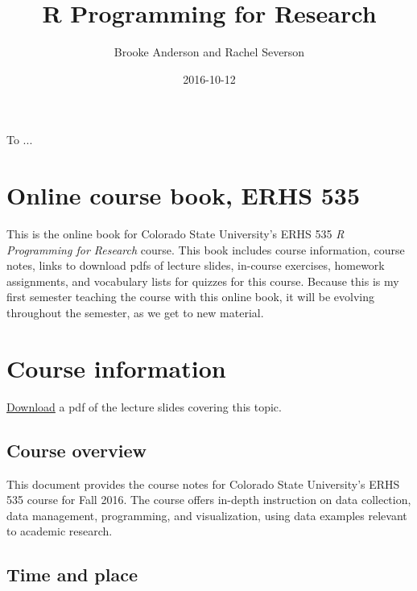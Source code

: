 \documentclass[]{book}
\title{R Programming for Research\\\vspace{0.5em}{\large Colorado State University, ERHS 535}}
\author{Brooke Anderson and Rachel Severson}
\date{2016-10-12}
\begin{document}
\maketitle

\cleardoublepage\newpage\thispagestyle{empty}\null
\cleardoublepage\newpage\thispagestyle{empty}
\begin{center}
To ...
\end{center}

\frontmatter

{
\setcounter{tocdepth}{1}
\tableofcontents
}
\chapter*{Online course book, ERHS
535}\label{online-course-book-erhs-535}

This is the online book for Colorado State University's ERHS 535 \emph{R
Programming for Research} course. This book includes course information,
course notes, links to download pdfs of lecture slides, in-course
exercises, homework assignments, and vocabulary lists for quizzes for
this course. Because this is my first semester teaching the course with
this online book, it will be evolving throughout the semester, as we get
to new material.

\mainmatter

\chapter*{Course information}\label{course-information}

\href{https://github.com/geanders/RProgrammingForResearch/raw/master/slides/CourseOverview.pdf}{Download}
a pdf of the lecture slides covering this topic.

\section{Course overview}\label{course-overview}

This document provides the course notes for Colorado State University's
ERHS 535 course for Fall 2016. The course offers in-depth instruction on
data collection, data management, programming, and visualization, using
data examples relevant to academic research.

\section{Time and place}\label{time-and-place}
\end{document}
